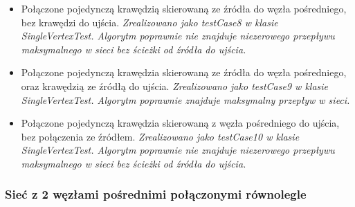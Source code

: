 \begin{itemize}[nosep]
    \item Połączone pojedynczą krawędzią skierowaną ze źródła do węzła
    pośredniego, bez krawędzi do ujścia.
    \emph{Zrealizowano jako testCase8 w klasie SingleVertexTest. Algorytm
    poprawnie nie znajduje niezerowego przepływu maksymalnego w sieci
    bez ścieżki od źródła do ujścia.}

    \item Połączone pojedynczą krawędzia skierowaną ze źródła do węzła
    pośredniego, oraz krawędzią ze źródłą do ujścia.
    \emph{Zrealizowano jako testCase9 w klasie SingleVertexTest. Algorytm
    poprawnie znajduje maksymalny przepływ w sieci.}

    \item Połączone pojedynczą krawędzia skierowaną z węzła pośredniego do
    ujścia, bez połączenia ze źródłem.
    \emph{Zrealizowano jako testCase10 w klasie SingleVertexTest. Algorytm
    poprawnie nie znajduje niezerowego przepływu maksymalnego w sieci
    bez ścieżki od źródła do ujścia.}
\end{itemize}


\subsubsection{Sieć z 2 węzłami pośrednimi połączonymi równolegle}

